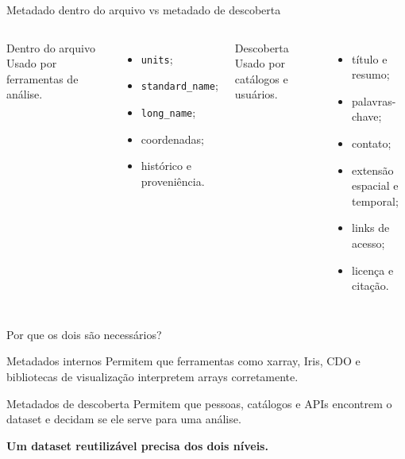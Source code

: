 \documentclass[aspectratio=169]{beamer}
\begin{document}
\begin{frame}{Metadado dentro do arquivo vs metadado de descoberta}
\begin{columns}
\begin{block}{Dentro do arquivo}
Usado por ferramentas de análise.
\end{block}

\begin{itemize}
  \item \texttt{units};
  \item \texttt{standard\_name};
  \item \texttt{long\_name};
  \item coordenadas;
  \item histórico e proveniência.
\end{itemize}

\begin{block}{Descoberta}
Usado por catálogos e usuários.
\end{block}

\begin{itemize}
  \item título e resumo;
  \item palavras-chave;
  \item contato;
  \item extensão espacial e temporal;
  \item links de acesso;
  \item licença e citação.
\end{itemize}
\end{columns}
\end{frame}

\begin{frame}{Por que os dois são necessários?}
\Large
\begin{block}{Metadados internos}
Permitem que ferramentas como xarray, Iris, CDO e bibliotecas de visualização interpretem arrays corretamente.
\end{block}

\vspace{0.3cm}

\begin{block}{Metadados de descoberta}
Permitem que pessoas, catálogos e APIs encontrem o dataset e decidam se ele serve para uma análise.
\end{block}

\vspace{0.3cm}

\centering
\textbf{Um dataset reutilizável precisa dos dois níveis.}
\end{frame}
\end{document}
